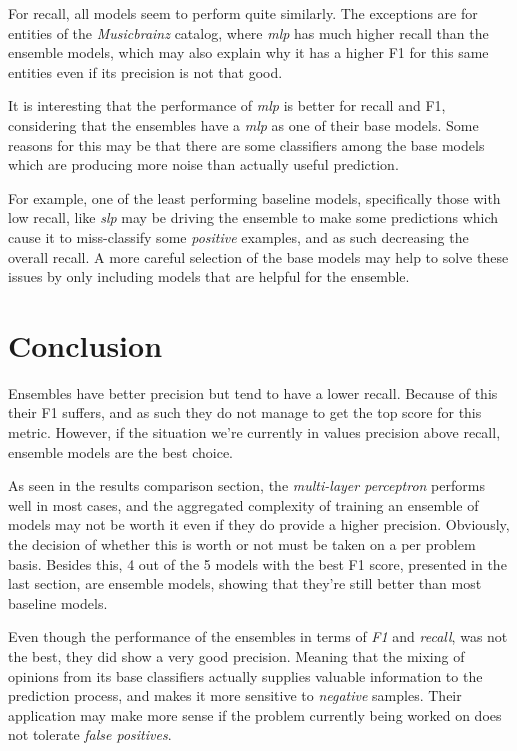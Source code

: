 \documentclass[epsfig,a4paper,11pt,titlepage,twoside,openany]{book}
\begin{document}
For recall, all models seem to perform quite similarly. The exceptions are for entities of the \textit{Musicbrainz} catalog, where \textit{mlp} has much higher recall than the ensemble models, which may also explain why it has a higher F1 for this same entities even if its precision is not that good.

It is interesting that the performance of \textit{mlp} is better for recall and F1, considering that the ensembles have a \textit{mlp} as one of their base models. Some reasons for this may be that there are some classifiers among the base models which are producing more noise than actually useful prediction. 

For example, one of the least performing baseline models, specifically those with low recall, like \textit{slp} may be driving the ensemble to make some predictions which cause it to miss-classify some \textit{positive} examples, and as such decreasing the overall recall. A more careful selection of the base models may help to solve these issues by only including models that are helpful for the ensemble.


\chapter{Conclusion}
\label{chap:conclusion}

Ensembles have better precision but tend to have a lower recall. Because of this their F1 suffers, and as such they do not manage to get the top score for this metric. However, if the situation we're currently in values precision above recall, ensemble models are the best choice.

As seen in the results comparison section, the \textit{multi-layer perceptron} performs well in most cases, and the aggregated complexity of training an ensemble of models may not be worth it even if they do provide a higher precision. Obviously, the decision of whether this is worth or not must be taken on a per problem basis. Besides this, 4 out of the 5 models with the best F1 score, presented in the last section, are ensemble models, showing that they're still better than most baseline models.

Even though the performance of the ensembles in terms of \textit{F1} and \textit{recall}, was not the best, they did show a very good precision. Meaning that the mixing of opinions from its base classifiers actually supplies valuable information to the prediction process, and makes it more sensitive to \textit{negative} samples. Their application may make more sense if the problem currently being worked on does not tolerate \textit{false positives}.
\end{document}
